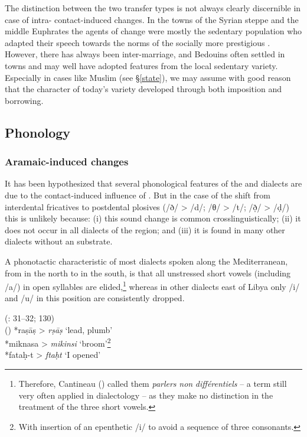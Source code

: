 \documentclass[output=paper]{langsci/langscibook}
\begin{document}
The distinction between the two {transfer} types is not always clearly discern\-ible in case of intra- contact-induced changes. In the towns of the Syrian steppe and the middle Euphrates the agents of change were mostly the sedentary population who adapted their speech towards the norms of the socially more {prestigious} . However, there has always been inter-marriage, and Bedouins often settled in towns and may well have adopted features from the local sedentary variety. Especially in cases like Muslim  (see §\ref{state}), we may assume with good reason that the  character of today’s variety developed through both {imposition} and borrowing. 

  \subsection{Phonology} 
 \subsubsection{Aramaic-induced changes} 

It has been hypothesized that several phonological features of the  and  dialects are due to the contact-induced influence of . But in the case of the shift from interdental fricatives to postdental plosives (/ð/ > /d/; /θ/ > /t/; /ð̣/ > /ḍ/) this is unlikely because: (i) this sound change is common crosslinguistically; (ii) it does not occur in all dialects of the region; and (iii) it is found in many other  dialects without an  {substrate}. 

A phonotactic characteristic of most dialects spoken along the Mediterranean, from  in the north to  in the south, is that all unstressed short vowels (including /a/) in open syllables are elided,\footnote{Therefore, Cantineau (\citeyear[108]{Cantineau1960book}) called them \textit{parlers} \textit{non} \textit{différentiels} – a term still very often applied in  dialectology – as they make no distinction in the treatment of the three short vowels.} whereas in other dialects east of Libya only /i/ and /u/ in this position are consistently dropped.

\ea
{  (\citealt{Procházka2002Cukurova}: 31--32; 130)}\\
  \textup{  ()} *raṣāṣ > \textit{rṣāṣ}  \textup{‘lead, plumb’\\
} *miknasa > \textit{mikinsi} ‘\textup{broom’}\footnote{With insertion of an epenthetic /i/ to avoid a sequence of three consonants.}\\
*fataḥ-t > \textit{ftaḥt} ‘\textup{I opened’}\\
  \z
  
\end{document}
